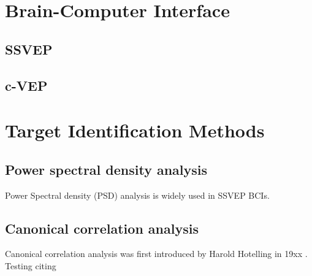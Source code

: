 
\chapter{Brain-Computer Interface}
\section{SSVEP}
\section{c-VEP}
\chapter{Target Identification Methods}
\section{Power spectral density analysis}
Power Spectral density (PSD) analysis is widely used in SSVEP BCIs\cite{bin2009cca}.
\section{Canonical correlation analysis}
Canonical correlation analysis was first introduced by Harold Hotelling in 19xx . Testing citing\cite{scipy}\cite{scikit-learn}\cite{psychopy}